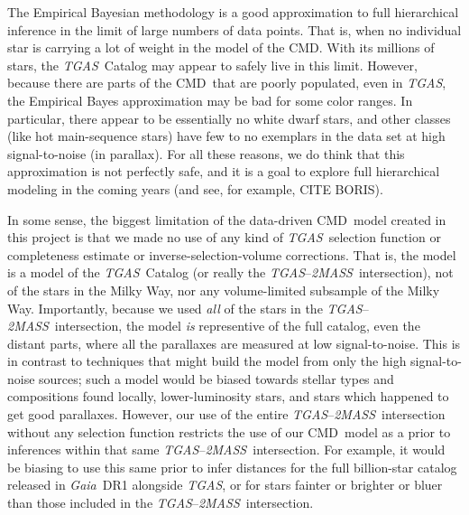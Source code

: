\documentclass[modern]{aastex61}
\newcommand{\acronym}[1]{{\small{#1}}}
\newcommand{\project}[1]{\textsl{#1}}
\newcommand{\tgas}{\project{\acronym{TGAS}}}
\newcommand{\tmass}{\project{\acronym{2MASS}}}
\newcommand{\gaia}{\project{Gaia}}
\newcommand{\cmd}{\acronym{CMD}}
\begin{document}
The Empirical Bayesian methodology is a good approximation to full
hierarchical inference in the limit of large numbers of data points.
That is, when no individual star is carrying a lot of weight in the
model of the \cmd.
With its millions of stars, the \tgas\ Catalog may appear to safely
live in this limit.
However, because there are parts of the \cmd\ that are poorly populated,
even in \tgas, the Empirical Bayes approximation may be bad for some
color ranges.
In particular, there appear to be essentially no white dwarf stars,
and other classes (like hot main-sequence stars) have few to no exemplars
in the data set at high signal-to-noise (in parallax).
For all these reasons, we do think that this approximation is not perfectly
safe, and it is a goal to explore full hierarchical modeling in the coming
years (and see, for example, CITE BORIS).

In some sense, the biggest limitation of the data-driven \cmd\ model
created in this project is that we made no use of any kind of \tgas\ selection
function or completeness estimate or inverse-selection-volume corrections.
That is, the model is a model of the \tgas\ Catalog
(or really the \tgas--\tmass\ intersection), not of the stars in
the Milky Way, nor any volume-limited subsample of the Milky Way.
Importantly, because we used \emph{all} of the stars in the \tgas--\tmass\
intersection, the model \emph{is} representive of the full catalog,
even the distant parts, where all the parallaxes are measured at low
signal-to-noise.
This is in contrast to techniques that might build the model from only
the high signal-to-noise sources; such a model would be biased towards
stellar types and compositions found locally, lower-luminosity stars,
and stars which happened to get good parallaxes.
However, our use of the entire \tgas--\tmass\ intersection without
any selection function restricts the use of our \cmd\ model as a prior
to inferences within that same \tgas--\tmass\ intersection.
For example, it would be biasing to use this same prior to infer
distances for the full billion-star catalog released in \gaia\ DR1
alongside \tgas, or for stars fainter or brighter or bluer than those
included in the \tgas--\tmass\ intersection.
\end{document}

